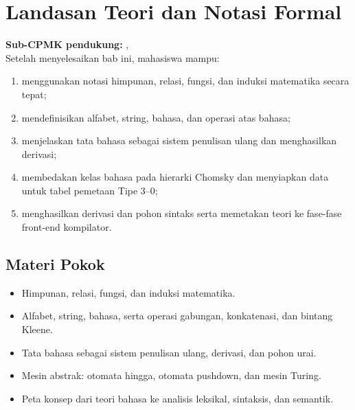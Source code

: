 \documentclass[../../main.tex]{subfiles}
\begin{document}
\chapter[Landasan Teori dan Notasi Formal]{Landasan Teori dan Notasi Formal}
\label{chap:landasan}

\begin{outcomebox}
\textbf{Sub-CPMK pendukung:} , \\[3pt]
Setelah menyelesaikan bab ini, mahasiswa mampu:
\begin{enumerate}[label=\arabic*.,leftmargin=*]
  \item menggunakan notasi himpunan, relasi, fungsi, dan induksi
        matematika secara tepat;
  \item mendefinisikan alfabet, string, bahasa, dan operasi atas bahasa;
  \item menjelaskan tata bahasa sebagai sistem penulisan ulang dan
        menghasilkan derivasi;
  \item membedakan kelas bahasa pada hierarki Chomsky dan menyiapkan
        data untuk tabel pemetaan Tipe 3--0;
  \item menghasilkan derivasi dan pohon sintaks serta memetakan teori
        ke fase-fase front-end kompilator.
\end{enumerate}
\end{outcomebox}

\section*{Materi Pokok}
\begin{itemize}[leftmargin=*]
  \item Himpunan, relasi, fungsi, dan induksi matematika.
  \item Alfabet, string, bahasa, serta operasi gabungan, konkatenasi,
        dan bintang Kleene.
  \item Tata bahasa sebagai sistem penulisan ulang, derivasi, dan pohon
        urai.
  \item Mesin abstrak: otomata hingga, otomata pushdown, dan mesin
        Turing.
  \item Peta konsep dari teori bahasa ke analisis leksikal, sintaksis,
        dan semantik.
\end{itemize}















\ifSubfilesClassLoaded{%
}{}
\end{document}
